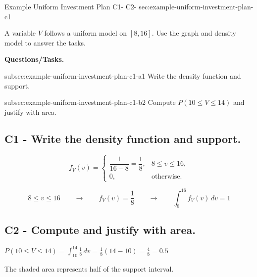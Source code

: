 	\sectionScored
	{Example Uniform Investment Plan}
	{C1- \hspace{2mm} C2-}
	{sec:example-uniform-investment-plan-c1}
	{
	A variable $V$ follows a uniform model on $[8,16]$. Use the graph and density model to answer the tasks.
	
	\textbf{Questions/Tasks.}
	\begin{enumerate}
		\CriterionTask
		{subsec:example-uniform-investment-plan-c1-a}{1}
		{Write the density function and support. }
		
		\CriterionTask
		{subsec:example-uniform-investment-plan-c1-b}{2}
		{Compute $P(10\le V\le 14)$ and justify with area. }
	\end{enumerate}
	
	\label{subsec:example-uniform-investment-plan-c1-a}
	\subsection*{C1 - Write the density function and support. }
	
	\[
	f_V(v)=
	\begin{cases}
		\dfrac{1}{16-8}=\dfrac18, & 8\le v\le 16,\\
		0, & \text{otherwise.}
	\end{cases}
	\]
	
	\[
	8\le v\le 16
	\qquad \longrightarrow \qquad
	f_V(v)=\frac18
	\qquad \longrightarrow \qquad
	\int_8^{16} f_V(v)\,dv=1
	\]
	
	\vspace{-5mm}
	
	\label{subsec:example-uniform-investment-plan-c1-b}
	\subsection*{C2 - Compute  and justify with area. }
	
	\begin{minipage}[t]{0.42\textwidth}
		\vspace{0pt}
		\centering
	\end{minipage}
	\hfill
	\begin{minipage}[t]{0.54\textwidth}
		\vspace{0pt}
		\centering
		
		\(\displaystyle
		P(10\le V\le 14)
		=\int_{10}^{14}\frac18\,dv
		=\frac18(14-10)
		=\frac48
		=0.5
		\)
		
		\par\vspace{2mm}
		
		The shaded area represents half of the support interval.
	\end{minipage}
	
	}
	
